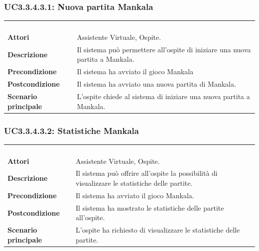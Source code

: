 \subsubsection{UC3.3.4.3.1: Nuova partita Mankala}
\label{UC3.3.4.3.1}
\begin{longtable}{l|p{10cm}}
\rowcolor[gray]{0.8} \multicolumn{2}{c}{} \\
\rowcolor[gray]{0.8} \multicolumn{2}{c}{\textbf{UC3.3.4.3.1 - Nuova partita Mankala}} \\
\rowcolor[gray]{0.8} \multicolumn{2}{c}{} \\
\hline
&\\
\textbf{Attori} & Assistente Virtuale, Ospite.\\[7pt]
\textbf{Descrizione} & Il sistema può permettere all'ospite di iniziare una nuova partita a Mankala.\\[7pt]
\textbf{Precondizione} & Il sistema ha avviato il gioco Mankala\\[7pt]
\textbf{Postcondizione} & Il sistema ha avviato una nuova partita di Mankala.\\[7pt]
\textbf{Scenario principale} &L'ospite chiede al sistema di iniziare una nuova partita a Mankala.\\[7pt]\hline
\end{longtable}

\subsubsection{UC3.3.4.3.2: Statistiche Mankala}
\label{UC3.3.4.3.2}
\begin{longtable}{l|p{10cm}}
\rowcolor[gray]{0.8} \multicolumn{2}{c}{} \\
\rowcolor[gray]{0.8} \multicolumn{2}{c}{\textbf{UC3.3.4.3.2 - Statistiche Mankala}} \\
\rowcolor[gray]{0.8} \multicolumn{2}{c}{} \\
\hline
&\\
\textbf{Attori} & Assistente Virtuale, Ospite.\\[7pt]
\textbf{Descrizione} & Il sistema può offrire all'ospite la possibilità di visualizzare le statistiche delle partite.\\[7pt]
\textbf{Precondizione} & Il sistema ha avviato il gioco Mankala.\\[7pt]
\textbf{Postcondizione} & Il sistema ha mostrato le statistiche delle partite all'ospite.\\[7pt]
\textbf{Scenario principale} &L'ospite ha richiesto di visualizzare le statistiche delle partite.\\[7pt]\hline
\end{longtable}

